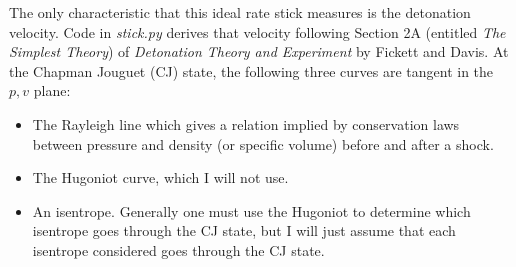 \documentclass[11pt]{article}
\begin{document}
The only characteristic that this ideal rate stick measures is the
detonation velocity.  Code in \emph{stick.py} derives that velocity
following Section 2A (entitled \emph{The Simplest Theory}) of
\emph{Detonation Theory and Experiment} by Fickett and
Davis\cite{FickettDavis}.  At the Chapman Jouguet (CJ) state, the
following three curves are tangent in the $p,v$ plane:
\begin{itemize}
\item The Rayleigh line which gives a relation implied by conservation
  laws between pressure and density (or specific volume) before and
  after a shock.
\item The Hugoniot curve, which I will not use.
\item An isentrope.  Generally one must use the Hugoniot to determine
  which isentrope goes through the CJ state, but I will just assume
  that each isentrope considered goes through the CJ state.
\end{itemize}
\end{document}
